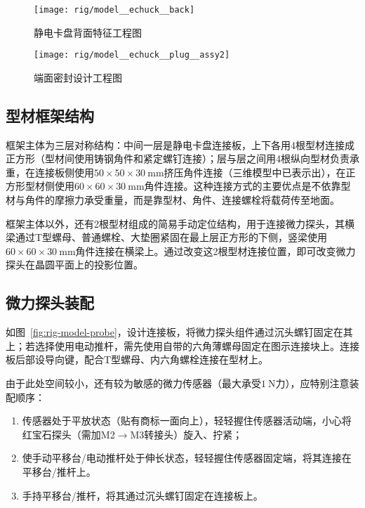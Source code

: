 
\begin{figure}[tbhp]
\centering
\texttt{[image: rig/model\_\_echuck\_\_back]}
\caption{静电卡盘背面特征工程图}
\label{fig:rig-model-echuck-back}
\end{figure}

\begin{figure}[tbhp]
\centering
\texttt{[image: rig/model\_\_echuck\_\_plug\_\_assy2]}
\caption{端面密封设计工程图}
\label{fig:rig-model-echuck-plug-assy}
\end{figure}


\subsection{型材框架结构}\label{sec:rig-model-frame}

框架主体为三层对称结构：中间一层是静电卡盘连接板，上下各用4根型材连接成正方形（型材间使用铸钢角件和紧定螺钉连接）；层与层之间用4根纵向型材负责承重，在连接板侧使用$\num{50}\times\num{50}\times\SI{30}{\milli\meter}$挤压角件连接（三维模型中已表示出），在正方形型材侧使用$\num{60}\times\num{60}\times\SI{30}{\milli\meter}$角件连接。这种连接方式的主要优点是不依靠型材与角件的摩擦力承受重量，而是靠型材、角件、连接螺栓将载荷传至地面。

框架主体以外，还有2根型材组成的简易手动定位结构，用于连接微力探头，其横梁通过T型螺母、普通螺栓、大垫圈紧固在最上层正方形的下侧，竖梁使用$\num{60}\times\num{60}\times\SI{30}{\milli\meter}$角件连接在横梁上。通过改变这2根型材连接位置，即可改变微力探头在晶圆平面上的投影位置。


\subsection{微力探头装配}\label{sec:rig-model-probe}


如图~\ref{fig:rig-model-probe}，设计连接板，将微力探头组件\footnotemark{}通过沉头螺钉固定在其上；若选择使用电动推杆，需先使用自带的六角薄螺母固定在图示连接块上。连接板后部设导向键，配合T型螺母、内六角螺栓连接在型材上。

由于此处空间较小，还有较为敏感的微力传感器（最大承受$\SI{1}{\newton}$力），应特别注意装配顺序：

\begin{enumerate}
  \item
    传感器处于平放状态（贴有商标一面向上），轻轻握住传感器活动端，小心将红宝石探头（需加M2$\to$M3转接头）旋入、拧紧；
  \item
    使手动平移台/电动推杆处于伸长状态，轻轻握住传感器固定端，将其连接在平移台/推杆上。
  \item
    手持平移台/推杆，将其通过沉头螺钉固定在连接板上。
\end{enumerate}

